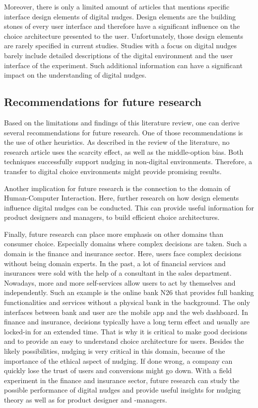 Moreover, there is only a limited amount of articles that mentions specific interface design elements of digital nudges. Design elements are the building stones of every user interface and therefore have a significant influence on the choice architecture presented to the user. Unfortunately, those design elements are rarely specified in current studies. Studies with a focus on digital nudges barely include detailed descriptions of the digital environment and the user interface of the experiment. Such additional information can have a significant impact on the understanding of digital nudges.
\\
 
\subsection{Recommendations for future research}
 
Based on the limitations and findings of this literature review, one can derive several recommendations for future research. One of those recommendations is the use of other heuristics. As described in the review of the literature, no research article uses the scarcity effect, as well as the middle-option bias. Both techniques successfully support nudging in non-digital environments. Therefore, a transfer to digital choice environments might provide promising results.
 
Another implication for future research is the connection to the domain of Human-Computer Interaction. Here, further research on how design elements influence digital nudges can be conducted. This can provide useful information for product designers and managers, to build efficient choice architectures. 
 
Finally, future research can place more emphasis on other domains than consumer choice. Especially domains where complex decisions are taken. Such a domain is the finance and insurance sector. Here, users face complex decisions without being domain experts. In the past, a lot of financial services and insurances were sold with the help of a consultant in the sales department. Nowadays, more and more self-services allow users to act by themselves and independently. %
Such an example is the online bank N26 that provides full banking functionalities and services without a physical bank in the background. The only interfaces between bank and user are the mobile app and the web dashboard. In finance and insurance, decisions typically have a long term effect and usually are locked-in for an extended time. That is why it is critical to make good decisions and to provide an easy to understand choice architecture for users. Besides the likely possibilities, nudging is very critical in this domain, because of the importance of the ethical aspect of nudging. If done wrong, a company can quickly lose the trust of users and conversions might go down. With a field experiment in the finance and insurance sector, future research can study the possible performance of digital nudges and provide useful insights for nudging theory as well as for product designer and -managers.